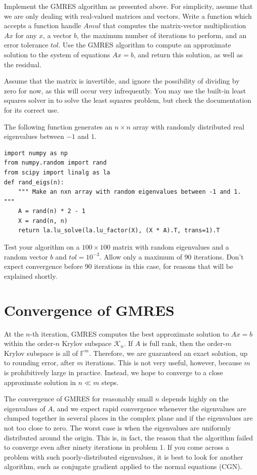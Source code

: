 \begin{problem}
Implement the GMRES algorithm as presented above. For simplicity, assume that we are only dealing with real-valued matrices and vectors.
Write a function  which accepts a function handle $Amul$ that computes the matrix-vector multiplication $Ax$ for any $x$,
a vector $b$, the maximum number of iterations to perform, and an error tolerance $tol$.
Use the GMRES algorithm to compute an approximate solution to the system of equations $Ax = b$, and return this solution, as well as
the residual.

Assume that the matrix is invertible, and ignore the possibility of dividing by zero for now, as this will occur very infrequently.
You may use the built-in least squares solver in  to solve the least squares problem, but check the documentation
for its correct use.

The following function generates an $n \times n$ array with randomly distributed real eigenvalues between $-1$ and $1$.
\begin{lstlisting}
import numpy as np
from numpy.random import rand
from scipy import linalg as la
def rand_eigs(n):
    """ Make an nxn array with random eigenvalues between -1 and 1. """
    A = rand(n) * 2 - 1
    X = rand(n, n)
    return la.lu_solve(la.lu_factor(X), (X * A).T, trans=1).T
\end{lstlisting}

Test your algorithm on a $100\times 100$ matrix with random eigenvalues and a random vector $b$ and $tol=10^{-3}$.
Allow only a maximum of 90 iterations.
Don't expect convergence before 90 iterations in this case, for reasons that will be explained shortly.
\label{prob:MyGMRES}
\end{problem}

\section*{Convergence of GMRES}
At the $n$-th iteration, GMRES computes the best approximate solution to $Ax = b$ within the order-$n$ Krylov subspace
$\mathcal{K}_n$.
If $A$ is full rank, then the order-$m$ Krylov subspace is all of  $\mathbb{F}^m$.
Therefore, we are guaranteed an exact solution, up to rounding error, after $m$ iterations.
This is not very useful, however, because $m$ is prohibitively large in practice.
Instead, we hope to converge to a close approximate solution in $n \ll m$ steps.

The convergence of GMRES for reasonably small $n$ depends highly on the eigenvalues of $A$, and we expect rapid convergence whenever
the eigenvalues are clumped together in several places in the complex plane and if the eigenvalues are not too close to zero.
The worst case is when the eigenvalues are uniformly distributed around the origin.
This is, in fact, the reason that the algorithm failed to converge even after ninety iterations in problem 1.
If you come across a problem with such poorly-distributed eigenvalues, it is best to look for another algorithm, such as conjugate
gradient applied to the normal equations (CGN).

